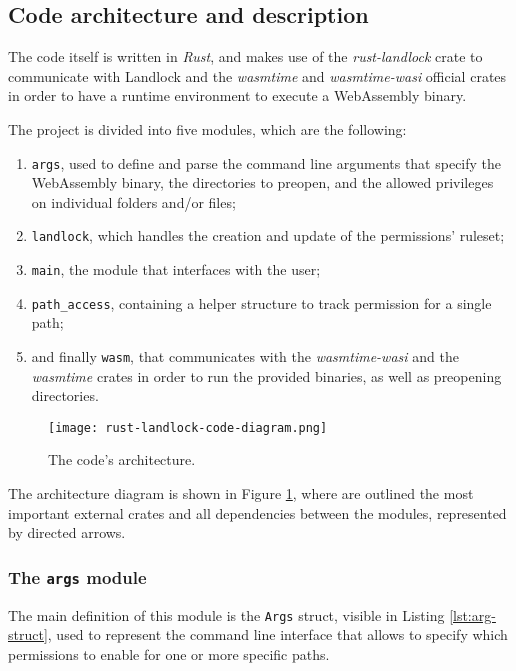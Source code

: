 \subsection{Code architecture and description}\label{sec:landlock-code-architecture}

The code itself is written in \textit{Rust}, and makes use of the
\textit{rust-landlock} \cite{rust-landlock} crate
to communicate with Landlock and the \textit{wasmtime} and \textit{wasmtime-wasi} official
crates in order to have a runtime environment to execute a WebAssembly binary.

The project is divided into five modules, which are the following:
\begin{enumerate}
  \item \texttt{args}, used to define and parse the command line arguments that specify the WebAssembly binary,
        the directories to preopen, and the allowed privileges on individual folders and/or files;
  \item \texttt{landlock}, which handles the creation and update of the permissions' ruleset;
  \item \texttt{main}, the module that interfaces with the user;
  \item \texttt{path\_access}, containing a helper structure to track permission for a single path;
  \item and finally \texttt{wasm}, that communicates with the \textit{wasmtime-wasi} and the \textit{wasmtime} crates
        in order to run the provided binaries, as well as preopening directories.
\end{enumerate}

\begin{figure}[ht]
  \centering
  \texttt{[image: rust-landlock-code-diagram.png]}
  \caption{The code's architecture.}
  \label{fig:rust-landlock-code-architecture}
\end{figure}

The architecture diagram is shown in Figure \ref{fig:rust-landlock-code-architecture}, where
are outlined the most important external crates and all dependencies between the modules, represented
by directed arrows.

\subsubsection{The \texttt{args} module}
\label{sec:landlock-args-module}

The main definition of this module is the \texttt{Args} struct, visible in Listing \ref{lst:arg-struct},
used to represent the command line interface that allows to specify which permissions to enable
for one or more specific paths.

